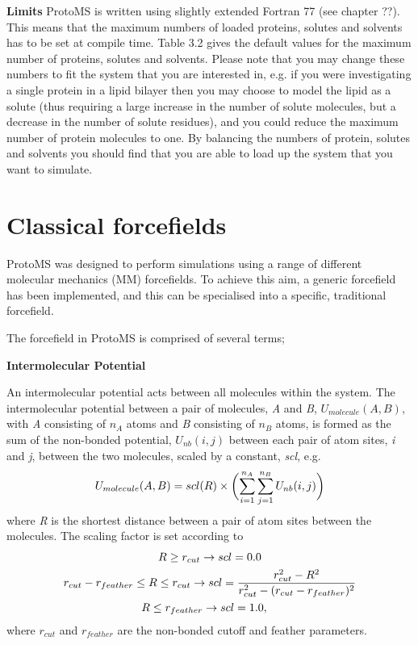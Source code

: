 \documentclass[letterpaper,10pt,english]{sphinxmanual}
\begin{document}
\textbf{Limits}
ProtoMS is written using slightly extended Fortran 77 (see chapter ??). This means that the maximum numbers of loaded proteins, solutes and solvents has to be set at compile time. Table 3.2 gives the default values for the maximum number of proteins, solutes and solvents. Please note that you may change these numbers to fit the system that you are interested in, e.g. if you were investigating a single protein in a lipid bilayer then you may choose to model the lipid as a solute (thus requiring a large increase in the number of solute molecules, but a decrease in the number of solute residues), and you could reduce the maximum number of protein molecules to one. By balancing the numbers of protein, solutes and solvents you should find that you are able to load up the system that you want to simulate.


\section{Classical forcefields}
\label{protoms:classical-forcefields}
ProtoMS was designed to perform simulations using a range of different molecular mechanics (MM) forcefields. To achieve this aim, a generic forcefield has been implemented, and this can be specialised into a specific, traditional forcefield.

The forcefield in ProtoMS is comprised of several terms;

\textbf{Intermolecular Potential}

An intermolecular potential acts between all molecules within the system. The intermolecular potential between a pair of molecules, \emph{A} and \emph{B}, \(U_{molecule} (A, B)\), with \emph{A} consisting of \(n_A\) atoms and \emph{B} consisting of \(n_B\) atoms, is formed as the sum of the non-bonded potential, \(U_{nb} (i, j)\) between each pair of atom sites, \emph{i} and \emph{j}, between the two molecules, scaled by a constant, \emph{scl}, e.g.
\begin{gather}
\begin{split}U_{molecule}(A,B) = scl(R)\times\biggl( \sum_{i=1}^{n_A} \sum_{j=1}^{n_B} U_{nb}(i,j) \biggr)\end{split}\notag
\end{gather}
where \emph{R} is the shortest distance between a pair of atom sites between the molecules. The scaling factor is set according to
\begin{gather}
\begin{split}&R \ge r_{cut} \rightarrow scl = 0.0 \\\end{split}\notag\\\begin{split}&r_{cut}-r_{feather} \le R \le r_{cut} \rightarrow scl = \frac{r_{cut}^2-R^2}{r_{cut}^2-(r_{cut}-r_{feather})^2} \\\end{split}\notag\\\begin{split}&R \le r_{feather} \rightarrow scl = 1.0,\end{split}\notag
\end{gather}
where \(r_{cut}\) and \(r_{feather}\) are the non-bonded cutoff and feather parameters.
\end{document}
